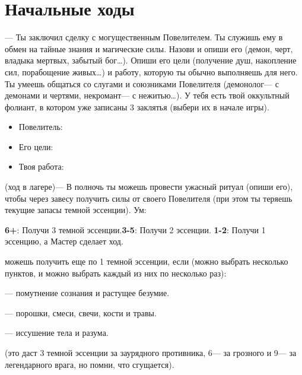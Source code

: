 \documentclass[10pt,twoside]{report}
\begin{document}
\section*{Начальные ходы}
\begin{description}[noitemsep]
\item[Сделка с Тьмой]--- Ты заключил сделку с могущественным Повелителем. Ты
служишь ему в обмен на тайные знания и магические силы. Назови и опиши
его (демон, черт, владыка мертвых, забытый бог\ldots). Опиши его цели
(получение душ, накопление сил, порабощение живых\ldots) и работу,
которую ты обычно выполняешь для него. Ты умеешь общаться со слугами и
союзниками Повелителя (демонолог--- с демонами и чертями, некромант--- с
нежитью\ldots). У тебя есть твой оккультный фолиант, в котором уже
записаны 3 заклятья (выбери их в начале игры).
\begin{itemize}[noitemsep]
\item Повелитель:
\item Его цели:
\item Твоя работа:
\end{itemize}
\vfill
\pagebreak

\item[Жуткий Ритуал] (ход в лагере)--- В полночь ты можешь провести
  ужасный ритуал (опиши его), чтобы через завесу получить силы от своего
Повелителя (при этом ты теряешь текущие запасы темной эссенции). { Ум:}

 \textbf{6+}: Получи 3 темной эссенции.\textbf{3-5}: Получи 2 эссенции.  \textbf{1-2}: Получи 1 эссенцию, а Мастер сделает ход.

{ можешь получить еще по 1 темной эссенции, если} (можно выбрать
несколько пунктов, и можно выбрать каждый из них по несколько раз):

\begin{description}[noitemsep]
\item[Потратить 1 Волю]--- помутнение сознания и растущее безумие.
\item[Потратить 1 Запас]--- порошки, смеси, свечи, кости и травы.
\item[Получить травму]--- иссушение тела и разума.

\item[Принести жертву] (это даст 3 темной эссенции за заурядного
  противника, 6--- за грозного и 9--- за легендарного врага, но помни,
  что { сгущается}).

\end{description}
\vfill
\pagebreak


\end{description}
\end{document}
